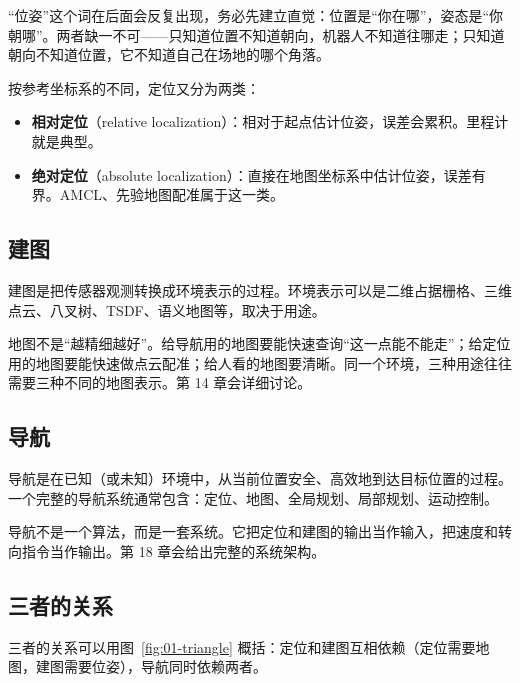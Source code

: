 “位姿”这个词在后面会反复出现，务必先建立直觉：位置是“你在哪”，姿态是“你朝哪”。两者缺一不可——只知道位置不知道朝向，机器人不知道往哪走；只知道朝向不知道位置，它不知道自己在场地的哪个角落。

按参考坐标系的不同，定位又分为两类：
\begin{itemize}
  \item \textbf{相对定位}（relative localization）：相对于起点估计位姿，误差会累积。里程计就是典型。
  \item \textbf{绝对定位}（absolute localization）：直接在地图坐标系中估计位姿，误差有界。AMCL、先验地图配准属于这一类。
\end{itemize}

\subsection{建图}

\begin{definition}[建图]
建图是把传感器观测转换成环境表示的过程。环境表示可以是二维占据栅格、三维点云、八叉树、TSDF、语义地图等，取决于用途。
\end{definition}

地图不是“越精细越好”。给导航用的地图要能快速查询“这一点能不能走”；给定位用的地图要能快速做点云配准；给人看的地图要清晰。同一个环境，三种用途往往需要三种不同的地图表示。第 14 章会详细讨论。

\subsection{导航}

\begin{definition}[导航]
导航是在已知（或未知）环境中，从当前位置安全、高效地到达目标位置的过程。一个完整的导航系统通常包含：定位、地图、全局规划、局部规划、运动控制。
\end{definition}

导航不是一个算法，而是一套系统。它把定位和建图的输出当作输入，把速度和转向指令当作输出。第 18 章会给出完整的系统架构。

\subsection{三者的关系}

三者的关系可以用图~\ref{fig:01-triangle} 概括：定位和建图互相依赖（定位需要地图，建图需要位姿），导航同时依赖两者。

